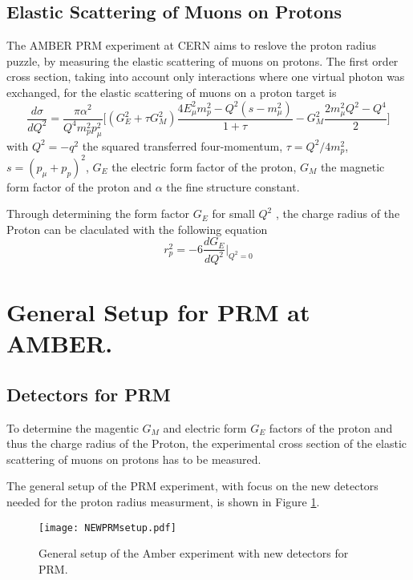 \subsection{Elastic Scattering of Muons on Protons}
The AMBER PRM experiment at CERN aims to reslove the proton radius puzzle, by measuring the elastic scattering of muons on protons.
The first order cross section, taking into account only interactions where one virtual photon was exchanged, 
for the elastic scattering of muons on a proton target is 
\begin{equation}
\label{eq:cross_section}
\frac{d\sigma}{dQ^2} = \frac{\pi \alpha^2}{Q^4 m_p^2 p_\mu^2} \bigg[ \left( G_E^2 + \tau G_M^2 \right) \frac{ 4E_\mu^2 m_p^2 
- Q^2 (s - m_\mu^2)}{1 + \tau }  - G_M^2 \frac{ 2m_\mu^2 Q^2 - Q^4}{2} \bigg]
\end{equation}
with  $Q^2 = -q^2$ 	the squared transferred four-momentum, $\tau = Q^2 / 4m_p^2$, $s = (p_\mu + p_p)^2$, 
 $G_E$ the electric form factor of the proton,
  $G_M$ the magnetic form factor of the proton and $\alpha$ the fine structure constant.\autocite{intentAmber}
  
Through determining the form factor $G_E$ for small $Q^2$ , the charge radius of the Proton can be claculated with the following equation\autocite{intentAmber}
\begin{equation}
\label{eq:charge_radius}
r_p^2 = -6 \frac{dG_E}{dQ^2} \bigg|_{Q^2 = 0}
\end{equation}

\section{General Setup for PRM at AMBER.}\label{sec:general_setup}
\subsection{Detectors for PRM}

To determine the magentic $G_M$ and electric form $G_E$ factors of the proton and thus the charge radius of the Proton,
 the experimental cross section of the elastic scattering of muons on protons has to be measured.

The general setup of the PRM experiment, with focus on the new detectors needed for the proton radius measurment, is shown in Figure \ref{fig:amber_setup}.
\begin{figure}[H]
	\centering
	\texttt{[image: NEWPRMsetup.pdf]}
	\caption{General setup of the Amber experiment with new detectors for PRM.\autocite{InternalcommunicationKarl}}
	\label{fig:amber_setup}
\end{figure}

